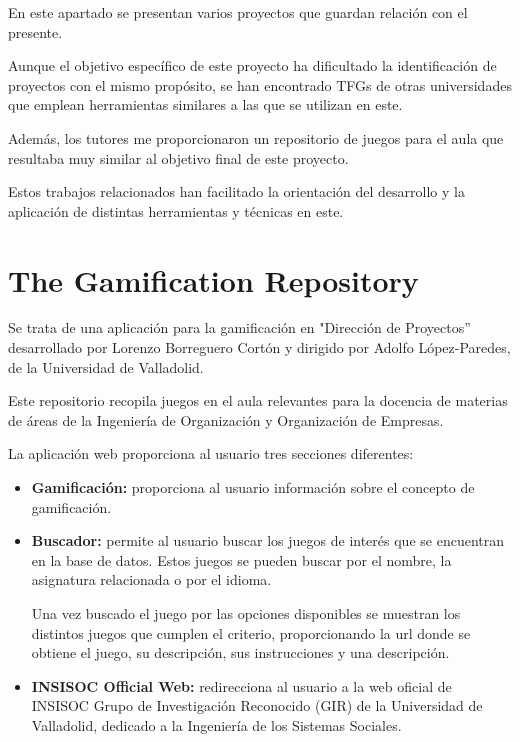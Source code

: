 
En este apartado se presentan varios proyectos que guardan relación con el presente.

Aunque el objetivo específico de este proyecto ha dificultado la identificación de proyectos con el mismo propósito, se han encontrado TFGs de otras universidades que emplean herramientas similares a las que se utilizan en este.

Además, los tutores me proporcionaron un repositorio de juegos para el aula que resultaba muy similar al objetivo final de este proyecto.

Estos trabajos relacionados han facilitado la orientación del desarrollo y la aplicación de distintas herramientas y técnicas en este.

\section{The Gamification Repository}
\cite{Repositorio} Se trata de una aplicación para la gamificación en "Dirección de Proyectos” desarrollado por Lorenzo Borreguero Cortón y dirigido por Adolfo López-Paredes, de la Universidad de Valladolid.

Este repositorio recopila juegos en el aula relevantes para la docencia de materias de áreas de la Ingeniería de Organización y Organización de Empresas. 

La aplicación web \cite{wordpress} proporciona al usuario tres secciones diferentes:
\begin{itemize}
    \item\textbf{Gamificación:} proporciona al usuario información sobre el concepto de gamificación.
    \item\textbf{Buscador:} permite al usuario buscar los juegos de interés que se encuentran en la base de datos. Estos juegos se pueden buscar por el nombre, la asignatura relacionada o por el idioma. 
    
    Una vez buscado el juego por las opciones disponibles se muestran los distintos juegos que cumplen el criterio, proporcionando la url donde se obtiene el juego, su descripción, sus instrucciones y una descripción.
    \item\textbf{INSISOC Official Web:} redirecciona al usuario a la web oficial de INSISOC Grupo de Investigación Reconocido (GIR) de la Universidad de Valladolid, dedicado a la Ingeniería de los Sistemas Sociales.    
\end{itemize}

